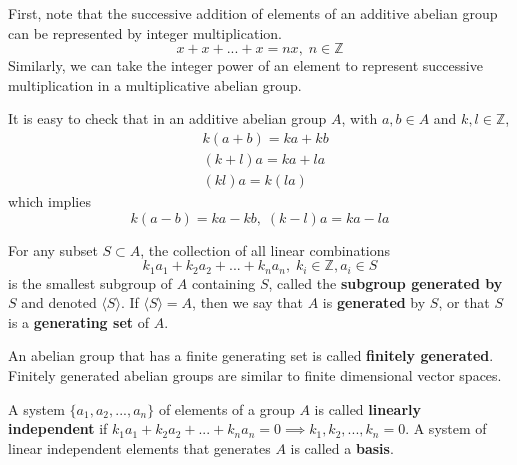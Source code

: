 \documentclass{article}
\begin{document}
    First, note that the successive addition of elements of an additive abelian group can be represented by integer multiplication. 
    \begin{equation}
      x + x + ... + x = n x, \; n \in \mathbb{Z}
    \end{equation}
    Similarly, we can take the integer power of an element to represent successive multiplication in a multiplicative abelian group. 

    \begin{proposition}
      It is easy to check that in an additive abelian group $A$, with $a, b \in A$ and $k, l \in \mathbb{Z}$, 
      \begin{align}
        & k (a + b) = k a + k b \\
        & (k + l) a = k a + l a \\
        & (k l) a = k (l a)
      \end{align}
      which implies
      \begin{equation}
        k(a - b) = k a - k b, \; (k - l) a = k a - l a
      \end{equation}
    \end{proposition}

    \begin{definition}
      For any subset $S \subset A$, the collection of all linear combinations 
      \begin{equation}
        k_1 a_1 + k_2 a_2 + ... + k_n a_n, \; k_i \in \mathbb{Z}, a_i \in S
      \end{equation}
      is the smallest subgroup of $A$ containing $S$, called the \textbf{subgroup generated by $S$} and denoted $\langle S \rangle$. If $\langle S \rangle = A$, then we say that $A$ is \textbf{generated} by $S$, or that $S$ is a \textbf{generating set} of $A$. 
    \end{definition}

    \begin{definition}
      An abelian group that has a finite generating set is called \textbf{finitely generated}. Finitely generated abelian groups are similar to finite dimensional vector spaces. 
    \end{definition}

    \begin{definition}
      A system $\{ a_1, a_2, ..., a_n\}$ of elements of a group $A$ is called \textbf{linearly independent} if $k_1 a_1 + k_2 a_2 + ... + k_n a_n = 0 \implies k_1, k_2, ..., k_n = 0$. A system of linear independent elements that generates $A$ is called a \textbf{basis}. 
    \end{definition}
\end{document}

